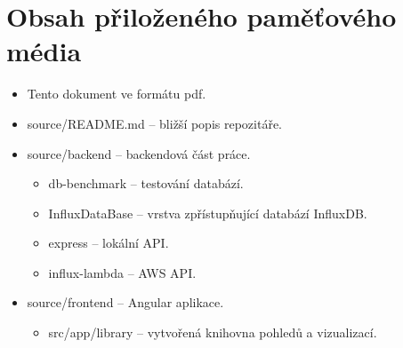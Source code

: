 \chapter{Obsah přiloženého paměťového média}
\begin{itemize}
    \item Tento dokument ve formátu pdf.
    \item source/README.md -- bližší popis repozitáře.
    \item source/backend -- backendová část práce.
    \begin{itemize}
        \item db-benchmark -- testování databází.
        \item InfluxDataBase --  vrstva zpřístupňující databází InfluxDB.
        \item express -- lokální API.
        \item influx-lambda -- AWS API.
    \end{itemize}
    \item source/frontend -- Angular aplikace.
    \begin{itemize}
        \item src/app/library -- vytvořená knihovna pohledů a vizualizací.
    \end{itemize}
\end{itemize}
